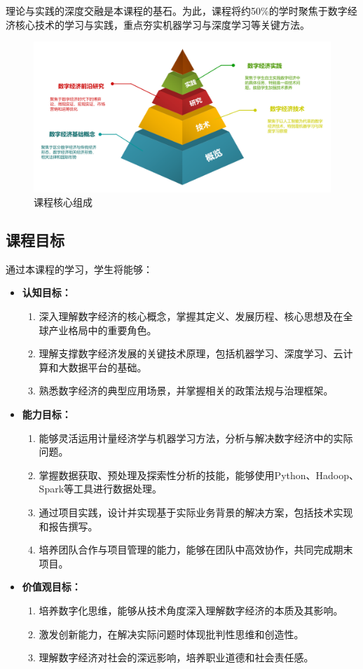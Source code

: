\documentclass[lang=cn,12pt,a4paper]{elegantpaper}
\begin{document}
理论与实践的深度交融是本课程的基石。为此，课程将约50\%的学时聚焦于数字经济核心技术的学习与实践，重点夯实机器学习与深度学习等关键方法。

\begin{figure}[H]
    \centering
    \includegraphics[width=1\linewidth]{course.pdf}
    \caption{课程核心组成}
    \label{fig:course}
\end{figure}

\subsection{课程目标} \label{sec:goals}
通过本课程的学习，学生将能够：
\begin{itemize}
    \item \textbf{认知目标：}
    \begin{enumerate}
        \item 深入理解数字经济的核心概念，掌握其定义、发展历程、核心思想及在全球产业格局中的重要角色。
        \item 理解支撑数字经济发展的关键技术原理，包括机器学习、深度学习、云计算和大数据平台的基础。
        \item 熟悉数字经济的典型应用场景，并掌握相关的政策法规与治理框架。
    \end{enumerate}
    \item \textbf{能力目标：}
    \begin{enumerate}
        \item 能够灵活运用计量经济学与机器学习方法，分析与解决数字经济中的实际问题。
        \item 掌握数据获取、预处理及探索性分析的技能，能够使用Python、Hadoop、Spark等工具进行数据处理。
        \item 通过项目实践，设计并实现基于实际业务背景的解决方案，包括技术实现和报告撰写。
        \item 培养团队合作与项目管理的能力，能够在团队中高效协作，共同完成期末项目。
    \end{enumerate}
    \item \textbf{价值观目标：}
    \begin{enumerate}
        \item 培养数字化思维，能够从技术角度深入理解数字经济的本质及其影响。
        \item 激发创新能力，在解决实际问题时体现批判性思维和创造性。
        \item 理解数字经济对社会的深远影响，培养职业道德和社会责任感。
    \end{enumerate}
\end{itemize}
\end{document}
